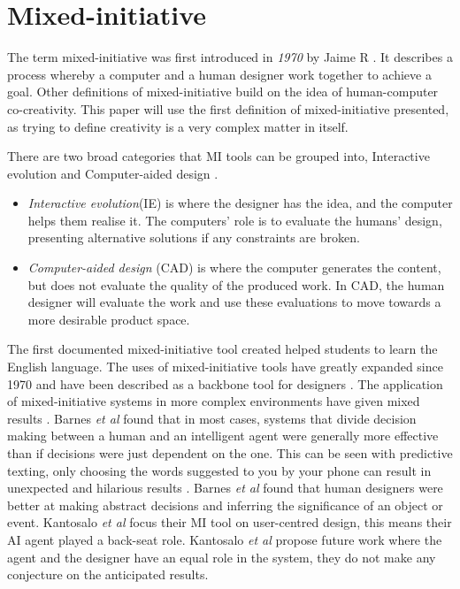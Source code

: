 \documentclass[journal]{IEEEtran}
\begin{document}
\section{Mixed-initiative} \label{MI}
The term mixed-initiative was first introduced in \textit{1970} by Jaime R \cite{carbonell1970mixed}.
It describes a process whereby a computer and a human designer work together to achieve a goal. Other definitions of mixed-initiative build on the idea of human-computer co-creativity. This paper will use the first definition of mixed-initiative presented, as trying to define creativity is a very complex matter in itself. 

There are two broad categories that MI tools can be grouped into, Interactive evolution and Computer-aided design \cite{liapis2016mixed}. 
\begin{itemize}
    \item \textit{Interactive evolution}(IE) is where the designer has the idea, and the computer helps them realise it. The computers' role is to evaluate the humans' design, presenting alternative solutions if any constraints are broken. 
    
    \item \textit{Computer-aided design} (CAD) is where the computer generates the content, but does not evaluate the quality of the produced work. In CAD, the human designer will evaluate the work and use these evaluations to move towards a more desirable product space.
\end{itemize}

The first documented mixed-initiative tool created helped students to learn the English language\cite{carbonell1970mixed}. The uses of mixed-initiative tools have greatly expanded since 1970 and have been described as a backbone tool for designers \cite{alvarez2018fostering}. The application of mixed-initiative systems in more complex environments have given mixed results \cite{barnes2015designing}. Barnes \textit{et al}\cite{barnes2015designing} found that in most cases, systems that divide decision making between a human and an intelligent agent were generally more effective than if decisions were just dependent on the one. This can be seen with predictive texting, only choosing the words suggested to you by your phone can result in unexpected and hilarious results \cite{quicktype}. Barnes \textit{et al}\cite{barnes2015designing} found that human designers were better at making abstract decisions and inferring the significance of an object or event. Kantosalo \textit{et al}\cite{kantosalo2014isolation} focus their MI tool on user-centred design, this means their AI agent played a back-seat role. Kantosalo \textit{et al}\cite{kantosalo2014isolation} propose future work where the agent and the designer have an equal role in the system, they do not make any conjecture on the anticipated results.
\end{document}
